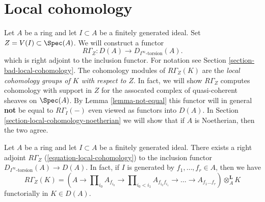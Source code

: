 \section{Local cohomology}
\label{section-local-cohomology}

\noindent
Let $A$ be a ring and let $I \subset A$ be a finitely generated ideal.
Set $Z = V(I) \subset \Spec(A)$. We will construct a functor
\begin{equation}
\label{equation-local-cohomology}
R\Gamma_Z : D(A) \longrightarrow D_{I^\infty\text{-torsion}}(A).
\end{equation}
which is right adjoint to the inclusion functor. For notation
see Section \ref{section-bad-local-cohomology}. The cohomology
modules of $R\Gamma_Z(K)$ are the {\it local cohomology groups
of $K$ with respect to $Z$}. In fact, we will show $R\Gamma_Z$
computes cohomology with support in $Z$ for the assocated
complex of quasi-coherent sheaves on $\Spec(A)$. By
Lemma \ref{lemma-not-equal} this functor will in general {\bf not} be
equal to $R\Gamma_I( - )$ even viewed as functors into $D(A)$.
In Section \ref{section-local-cohomology-noetherian}
we will show that if $A$ is Noetherian, then the two agree.

\begin{lemma}
\label{lemma-local-cohomology-adjoint}
Let $A$ be a ring and let $I \subset A$ be a finitely generated ideal.
There exists a right adjoint $R\Gamma_Z$ (\ref{equation-local-cohomology})
to the inclusion functor $D_{I^\infty\text{-torsion}}(A) \to D(A)$.
In fact, if $I$ is generated by $f_1, \ldots, f_r \in A$, then we have
$$
R\Gamma_Z(K) =
(A \to \prod\nolimits_{i_0} A_{f_{i_0}} \to
\prod\nolimits_{i_0 < i_1} A_{f_{i_0}f_{i_1}}
\to \ldots \to A_{f_1\ldots f_r}) \otimes_A^\mathbf{L} K
$$
functorially in $K \in D(A)$.
\end{lemma}

